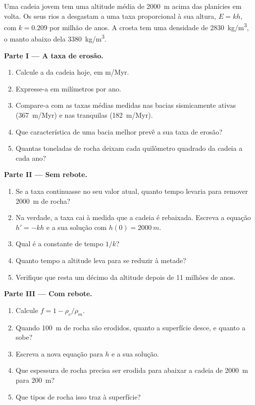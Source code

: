 \begin{problem}
\label{pb:g12:destruction-of-mountains:1}
Uma cadeia jovem tem uma altitude média de \qty{2000}{m} acima das planícies
em volta. Os seus rios a desgastam a uma taxa proporcional à sua altura,
$E = kh$, com $k = 0.209$ por milhão de anos. A crosta tem uma densidade de
\qty{2830}{kg/m^3}, o manto abaixo dela \qty{3380}{kg/m^3}.

\medskip
\noindent\textbf{Parte I --- A taxa de erosão.}
\begin{enumerate}
  \item Calcule a  da cadeia hoje, em \unit{m/Myr}.
  \item Expresse-a em milímetros por ano.
  \item Compare-a com as taxas médias medidas nas bacias sismicamente ativas
        (\qty{367}{m/Myr}) e nas tranquilas (\qty{182}{m/Myr}).
  \item Que característica de uma bacia melhor prevê a sua taxa de erosão?
  \item Quantas toneladas de rocha deixam cada quilômetro quadrado da cadeia
        a cada ano?
\end{enumerate}

\medskip
\noindent\textbf{Parte II --- Sem rebote.}
\begin{enumerate}[resume]
  \item Se a taxa continuasse no seu valor atual, quanto tempo levaria para
        remover \qty{2000}{m} de rocha?
  \item Na verdade, a taxa cai à medida que a cadeia é rebaixada. Escreva a
        equação $h' = -kh$ e a sua solução com $h(0) = \qty{2000}{m}$.
  \item Qual é a constante de tempo $1/k$?
  \item Quanto tempo a altitude leva para se reduzir à metade?
  \item Verifique que resta um décimo da altitude depois de 11 milhões de
        anos.
\end{enumerate}

\medskip
\noindent\textbf{Parte III --- Com rebote.}
\begin{enumerate}[resume]
  \item Calcule $f = 1 - \rho_c/\rho_m$.
  \item Quando \qty{100}{m} de rocha são erodidos, quanto a superfície desce,
        e quanto a  sobe?
  \item Escreva a nova equação para $h$ e a sua solução.
  \item Que espessura de rocha precisa ser erodida para abaixar a cadeia de
        \qty{2000}{m} para \qty{200}{m}?
  \item Que tipos de rocha isso traz à superfície?
\end{enumerate}


\end{problem}
